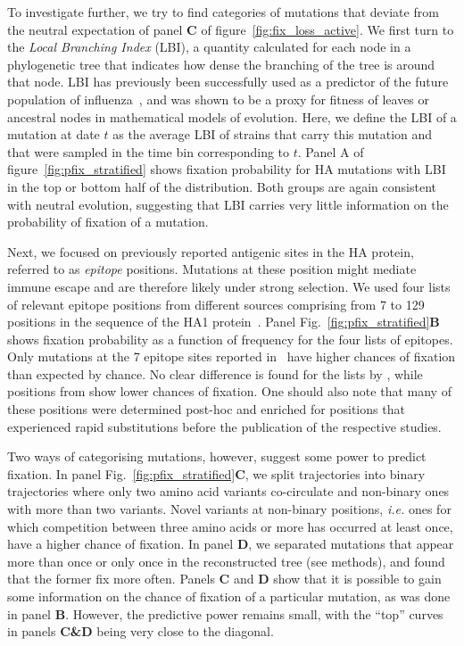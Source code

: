 \documentclass[reprint,amsmath,amssymb,superscriptaddress,showpacs,pre]{revtex4-1}
\begin{document}
To investigate further, we try to find categories of mutations that deviate from the neutral expectation of panel \textbf{C} of figure~\ref{fig:fix_loss_active}. 
We first turn to the \emph{Local Branching Index} (LBI), a quantity calculated for each node in a phylogenetic tree that indicates how dense the branching of the tree is around that node. 
LBI has previously been successfully used as a predictor of the future population of influenza~\cite{neher_predicting_2014}, and was shown to be a proxy for fitness of leaves or ancestral nodes in mathematical models of evolution. 
Here, we define the LBI of a mutation at date $t$ as the average LBI of strains that carry this mutation and that were sampled in the time bin corresponding to $t$. 
Panel A of figure~\ref{fig:pfix_stratified} shows fixation probability for HA mutations with LBI in the top or bottom half of the distribution. 
Both groups are again consistent with neutral evolution, suggesting that LBI carries very little information on the probability of fixation of a mutation.

Next, we focused on previously reported antigenic sites in the HA protein, referred to as \emph{epitope} positions. 
Mutations at these position might mediate immune escape and are therefore likely under strong selection. 
We used four lists of relevant epitope positions from different sources comprising from 7 to 129 positions in the sequence of the HA1 protein~\cite{Koel976, luksza_predictive_2014, Shih6283, wolf_long_2006}. 
Panel Fig.~\ref{fig:pfix_stratified}\textbf{B} shows fixation probability as a function of frequency for the four lists of epitopes. 
Only mutations at the 7 epitope sites reported in~\cite{Koel976} have higher chances of fixation than expected by chance. 
No clear difference is found for the lists by \citet{luksza_predictive_2014, wolf_long_2006}, while positions from \citet{Shih6283} show lower chances of fixation.
One should also note that many of these positions were determined post-hoc and enriched for positions that experienced rapid substitutions before the publication of the respective studies. 

Two ways of categorising mutations, however, suggest some power to predict fixation. 
In panel Fig.~\ref{fig:pfix_stratified}\textbf{C}, we split trajectories into binary trajectories where only two amino acid variants co-circulate and non-binary ones with more than two variants. 
Novel variants at non-binary positions, \emph{i.e.} ones for which competition between three amino acids or more has occurred at least once, have a higher chance of fixation. 
In panel \textbf{D}, we separated mutations that appear more than once or only once in the reconstructed tree (see methods), and found that the former fix more often. 
Panels \textbf{C} and \textbf{D} show that it is possible to gain some information on the chance of fixation of a particular mutation, as was done in panel \textbf{B}. 
However, the predictive power remains small, with the ``top'' curves in panels \textbf{C\&D} being very close to the diagonal. 
\end{document}
